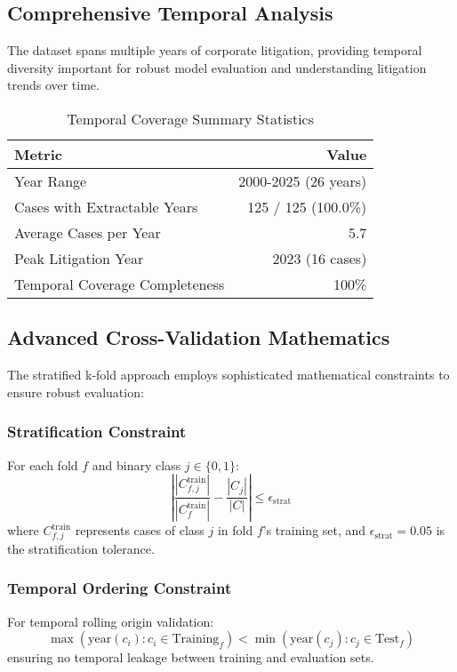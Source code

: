 \documentclass[11pt,a4paper]{article}
\begin{document}
\subsection{Comprehensive Temporal Analysis}

The dataset spans multiple years of corporate litigation, providing temporal diversity important for robust model evaluation and understanding litigation trends over time.

\begin{table}[H]
\centering
\caption{Temporal Coverage Summary Statistics}
\begin{tabular}{lr}
\toprule
\textbf{Metric} & \textbf{Value} \\
\midrule
Year Range & 2000-2025 (26 years) \\
Cases with Extractable Years & 125 / 125 (100.0\%) \\
Average Cases per Year & 5.7 \\
Peak Litigation Year & 2023 (16 cases) \\
Temporal Coverage Completeness & 100\% \\
\bottomrule
\end{tabular}
\end{table}

\subsection{Advanced Cross-Validation Mathematics}

The stratified k-fold approach employs sophisticated mathematical constraints to ensure robust evaluation:

\subsubsection{Stratification Constraint}
For each fold $f$ and binary class $j \in \{0,1\}$:
\begin{equation}
\left| \frac{|C_{f,j}^{\text{train}}|}{|C_f^{\text{train}}|} - \frac{|C_j|}{|C|} \right| \leq \epsilon_{\text{strat}}
\end{equation}
where $C_{f,j}^{\text{train}}$ represents cases of class $j$ in fold $f$'s training set, and $\epsilon_{\text{strat}} = 0.05$ is the stratification tolerance.

\subsubsection{Temporal Ordering Constraint}
For temporal rolling origin validation:
\begin{equation}
\max(\text{year}(c_i) : c_i \in \text{Training}_f) < \min(\text{year}(c_j) : c_j \in \text{Test}_f)
\end{equation}
ensuring no temporal leakage between training and evaluation sets.
\end{document}
